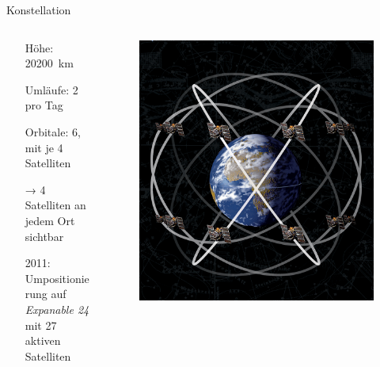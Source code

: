 \begin{frame}{Konstellation}
    \begin{columns}
        \begin{column}{0.5\textwidth}
            \begin{itemize}
                \item[Höhe:] \SI{20200}{\kilo\meter}
                \item[Umläufe:] 2 pro Tag
                \item[Orbitale:] 6, mit je 4 Satelliten
                \item[→] 4 Satelliten an jedem Ort sichtbar
                \item[2011:] Umpositionierung auf \textit{Expanable 24}\\mit 27 aktiven Satelliten
            \end{itemize}
        \end{column}
        \begin{column}{0.3\textwidth}
            \begin{figure}
                \includegraphics[width=\textwidth]{images/satelliten_schaubild.jpg}
            \end{figure}
        \end{column}
    \end{columns}
\end{frame}

